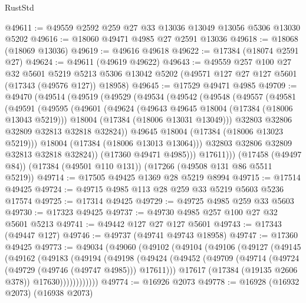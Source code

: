 \begin{lexlean}{RustStd}
\begin{coremodule}
@49611 := @49559 @2592 @259 @27 @33 @13036 @13049 @13056 @5306 @13030 @5202
@49616 := @18060 @49471 @4985 @27 @2591 @13036
@49618 := @18068 (@18069 @13036)
@49619 := @49616 @49618
@49622 := @17384 (@18074 @2591 @27)
@49624 := @49611 (@49619 @49622)
@49643 := @49559
    @257
    @100
    @27
    @32
    @5601
    @5219
    @5213
    @5306
    @13042
    @5202
    (@49571 @127 @27 @127 @5601 (@17343 (@49576 @127)) @18958)
@49645 := @17529 @49471 @4985
@49709 := @49470
    (@49514
      (@49519
        (@49529
          (@49534
            (@49542
              (@49548
                (@49557
                  (@49581
                    (@49591
                      (@49595
                        (@49601
                          (@49624
                            (@49643 @49645 @18004 (@17384 (@18006 @13043 @5219)))
                            @18004
                            (@17384 (@18006 @13031 @13049)))
                          @32803
                          @32806
                          @32809
                          @32813
                          @32818
                          @32824))
                      @49645
                      @18004
                      (@17384 (@18006 @13023 @5219)))
                    @18004
                    (@17384 (@18006 @13013 @13064)))
                  @32803
                  @32806
                  @32809
                  @32813
                  @32818
                  @32824))
              (@17360 @49471 @4985)))
          @17611)))
    (@17458 (@49497 @84))
    (@17384 (@49501 @110 @131))
    (@17266 (@49508 @131 @86 @5511 @5219))
@49714 := @17505 @49425 @1369 @28 @5219 @8994
@49715 := @17514 @49425
@49724 := @49715 @4985 @113 @28 @259 @33 @5219 @5603 @5236 @17574
@49725 := @17314 @49425
@49729 := @49725 @4985 @259 @33 @5603
@49730 := @17323 @49425
@49737 := @49730 @4985 @257 @100 @27 @32 @5601 @5213
@49741 := @49442 @127 @27 @127 @5601
@49743 := @17343 (@49447 @127)
@49746 := @49737 (@49741 @49743 @18958)
@49747 := @17360 @49425
@49773 := @49034
    (@49060
      (@49102
        (@49104
          (@49106
            (@49127
              (@49145
                (@49162
                  (@49183
                    (@49194
                      (@49198
                        (@49424
                          (@49452
                            (@49709 (@49714 (@49724 (@49729 (@49746 (@49747 @4985))) @17611)))
                            @17617
                            (@17384 (@19135 @2606 @378))
                            @17630))))))))))))
@49774 := @16926 @2073
@49778 := @16928 (@16932 @2073) (@16938 @2073)

\end{coremodule}
\end{lexlean}
